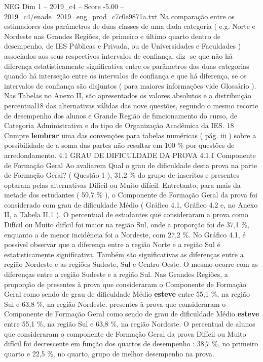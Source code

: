 \begin{textsample}{NEG Dim 1 – 2019\_c4 – Score -5.00 – 2019\_c4/enade\_2019\_eng\_prod\_c7c0e9871a.txt}
Na comparação entre os estimadores dos parâmetros de duas classes de uma dada categoria ( e.g.
Norte e Nordeste nas Grandes Regiões, de primeiro e último quarto dentro de desempenho, de IES Públicas e Privada, ou de Universidades e Faculdades ) associados aos seus respectivos intervalos de confiança, diz -se que não há diferença estatisticamente significativa entre os parâmetros das duas categorias quando há interseção entre os intervalos de confiança e que há diferença, se os intervalos de confiança são disjuntos ( para maiores informações vide Glossário ).
Nas Tabelas no Anexo II, são apresentados os valores absolutos e a distribuição percentual18 das alternativas válidas das nove questões, segundo o mesmo recorte de desempenho dos alunos e Grande Região de funcionamento do curso, de Categoria Administrativa e do tipo de Organização Acadêmica da IES. 18 Cumpre \textbf{lembrar} uma das convenções para tabelas numéricas ( pág. iii ) sobre a possibilidade de a soma das partes não resultar em 100 \% por questões de arredondamento. 4.1 GRAU DE DIFICULDADE DA PROVA 4.1.1 Componente de Formação Geral Ao avaliarem Qual o grau de dificuldade desta prova na parte de Formação Geral? ( Questão 1 ), 31,2 \% do grupo de inscritos e presentes optaram pelas alternativas Difícil ou Muito difícil.
Entretanto, para mais da metade dos estudantes ( 59,7 \% ), o Componente de Formação Geral da prova foi considerado com grau de dificuldade Médio ( Gráfico 4.1, Gráfico 4.2 e, no Anexo II, a Tabela II.1 ).
O percentual de estudantes que consideraram a prova como Difícil ou Muito difícil foi maior na região Sul, onde a proporção foi de 37,1 \%, enquanto a de menor incidência foi a Nordeste, com 27,2 \%.
No Gráfico 4.1, é possível observar que a diferença entre a região Norte e a região Sul é estatisticamente significativa.
Também são significativas as diferenças entre a região Nordeste e as regiões Sudeste, Sul e Centro-Oeste.
O mesmo ocorre com as diferenças entre a região Sudeste e a região Sul.
Nas Grandes Regiões, a proporção de presentes à prova que consideraram o Componente de Formação Geral como sendo de grau de dificuldade Médio \textbf{esteve} entre 55,1 \%, na região Sul e 63,8 \%, na região Nordeste. presentes à prova que consideraram o Componente de Formação Geral como sendo de grau de dificuldade Médio \textbf{esteve} entre 55,1 \%, na região Sul e 63,8 \%, na região Nordeste.
O percentual de alunos que consideraram o componente de Formação Geral da prova Difícil ou Muito difícil foi decrescente em função dos quartos de desempenho : 38,7 \%, no primeiro quarto e 22,5 \%, no quarto, grupo de melhor desempenho na prova.

\end{textsample}
